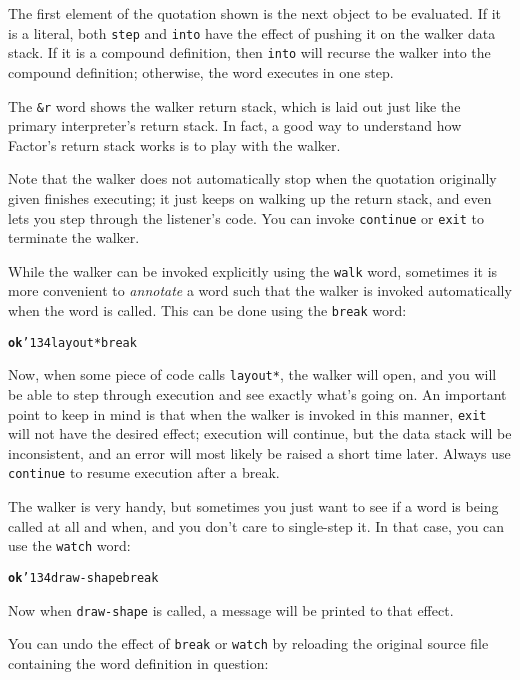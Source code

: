 \documentclass{report}
\newcommand{\bs}{\char'134}
\begin{document}
The first element of the quotation shown is the next object to be evaluated. If it is a literal, both \texttt{step} and \texttt{into} have the effect of pushing it on the walker data stack. If it is a compound definition, then \texttt{into} will recurse the walker into the compound definition; otherwise, the word executes in one step.

The \texttt{\&r} word shows the walker return stack, which is laid out just like the primary interpreter's return stack. In fact, a good way to understand how Factor's return stack works is to play with the walker.

Note that the walker does not automatically stop when the quotation originally given finishes executing; it just keeps on walking up the return stack, and even lets you step through the listener's code. You can invoke \texttt{continue} or \texttt{exit} to terminate the walker.

While the walker can be invoked explicitly using the \texttt{walk} word, sometimes it is more convenient to \emph{annotate} a word such that the walker is invoked automatically when the word is called. This can be done using the \texttt{break} word:

\begin{alltt}
\textbf{ok} \bs layout* break
\end{alltt}

Now, when some piece of code calls \texttt{layout*}, the walker will open, and you will be able to step through execution and see exactly what's going on. An important point to keep in mind is that when the walker is invoked in this manner, \texttt{exit} will not have the desired effect; execution will continue, but the data stack will be inconsistent, and an error will most likely be raised a short time later. Always use \texttt{continue} to resume execution after a break.

The walker is very handy, but sometimes you just want to see if a word is being called at all and when, and you don't care to single-step it. In that case, you can use the \texttt{watch} word:

\begin{alltt}
\textbf{ok} \bs draw-shape break
\end{alltt}

Now when \texttt{draw-shape} is called, a message will be printed to that effect.

You can undo the effect of \texttt{break} or \texttt{watch} by reloading the original source file containing the word definition in question:
\end{document}
